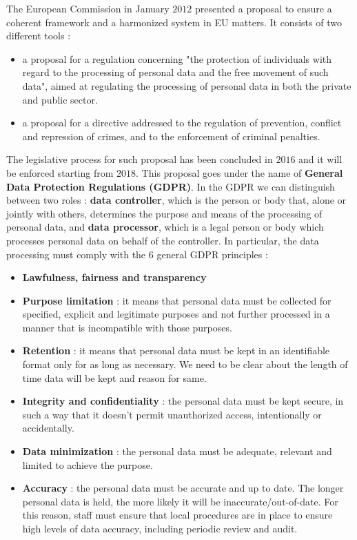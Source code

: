 The European Commission in January $2012$ presented a proposal to ensure a coherent framework and a harmonized system in EU matters. It consists of two different tools :
\begin{itemize}
\item a proposal for a regulation concerning "the protection of individuals with regard to the processing of personal data and the free movement of such data", aimed at regulating the processing of personal data in both the private and public sector.
\item a proposal for a directive addressed to the regulation of prevention, conflict and repression of crimes, and to the enforcement of criminal penalties.
\end{itemize}
The legislative process for such proposal has been concluded in $2016$ and it will be enforced starting from $2018$. This proposal goes under the name of \textbf{General Data Protection Regulations (GDPR)}. In the GDPR we can distinguish between two roles : \textbf{data controller}, which is the person or body that, alone or jointly with others, determines the purpose and means of the processing of personal data, and \textbf{data processor}, which is a legal person or body which processes personal data on behalf of the controller. In particular, the data processing must comply with the $6$ general GDPR principles :
\begin{itemize}
\item \textbf{Lawfulness, fairness and transparency}
\item \textbf{Purpose limitation} : it means that personal data must be collected for specified, explicit and legitimate purposes and not further processed in a manner that is incompatible with those purposes.
\item \textbf{Retention} : it means that personal data must be kept in an identifiable format only for as long as necessary. We need to be clear about the length of time data will be kept and reason for same.
\item \textbf{Integrity and confidentiality} : the personal data must be kept secure, in such a way that it doesn't permit unauthorized access, intentionally or accidentally.
\item \textbf{Data minimization} : the personal data must be adequate, relevant and limited to achieve the purpose.
\item \textbf{Accuracy} : the personal data must be accurate and up to date. The longer personal data is held, the more likely it will be inaccurate/out-of-date. For this reason, staff must ensure that local procedures are in place to ensure high levels of data accuracy, including periodic review and audit.
\end{itemize}
